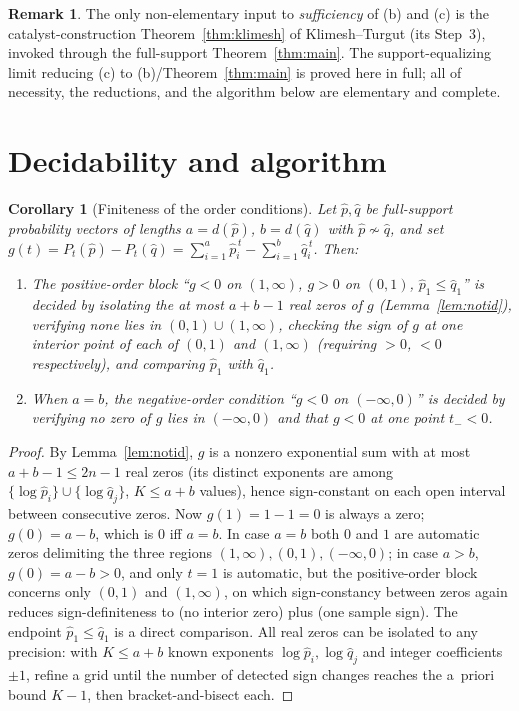 \documentclass{amsart}
\theoremstyle{plain}
\newtheorem{corollary}{Corollary}
\theoremstyle{definition}
\newtheorem{remark}{Remark}
\begin{document}
\begin{remark}\label{rem:c-suff-honest}
The only non-elementary input to \emph{sufficiency} of (b) and (c) is the
catalyst-construction Theorem~\ref{thm:klimesh} of Klimesh--Turgut (its Step~3),
invoked through the full-support Theorem~\ref{thm:main}. The support-equalizing limit
reducing (c) to (b)/Theorem~\ref{thm:main} is proved here in full; all of necessity,
the reductions, and the algorithm below are elementary and complete.
\end{remark}

\section{Decidability and algorithm}\label{sec:dec}

\begin{corollary}[Finiteness of the order conditions]\label{cor:finite}
Let $\hat p,\hat q$ be full-support probability vectors of lengths $a=d(\hat p)$,
$b=d(\hat q)$ with $\hat p\not\sim\hat q$, and set
$g(t)=P_t(\hat p)-P_t(\hat q)=\sum_{i=1}^{a}\hat p_i^{\,t}-\sum_{i=1}^{b}\hat q_i^{\,t}$.
Then:
\begin{enumerate}
\item The positive-order block ``$g<0$ on $(1,\infty)$, $g>0$ on $(0,1)$,
$\hat p_1\le\hat q_1$'' is decided by isolating the at most $a+b-1$ real zeros of $g$
(Lemma~\ref{lem:notid}), verifying none lies in $(0,1)\cup(1,\infty)$, checking the sign
of $g$ at one interior point of each of $(0,1)$ and $(1,\infty)$ (requiring $>0$, $<0$
respectively), and comparing $\hat p_1$ with $\hat q_1$.
\item When $a=b$, the negative-order condition ``$g<0$ on $(-\infty,0)$'' is decided by
verifying no zero of $g$ lies in $(-\infty,0)$ and that $g<0$ at one point $t_-<0$.
\end{enumerate}
\end{corollary}
\begin{proof}
By Lemma~\ref{lem:notid}, $g$ is a nonzero exponential sum with at most $a+b-1\le 2n-1$
real zeros (its distinct exponents are among $\{\log\hat p_i\}\cup\{\log\hat q_j\}$,
$K\le a+b$ values), hence sign-constant on each open interval between consecutive zeros.
Now $g(1)=1-1=0$ is always a zero; $g(0)=a-b$, which is $0$ iff $a=b$. In case
$a=b$ both $0$ and $1$ are automatic zeros delimiting the three regions $(1,\infty),
(0,1),(-\infty,0)$; in case $a>b$, $g(0)=a-b>0$, and only $t=1$ is automatic, but the
positive-order block concerns only $(0,1)$ and $(1,\infty)$, on which sign-constancy
between zeros again reduces sign-definiteness to (no interior zero) plus (one sample
sign). The endpoint $\hat p_1\le\hat q_1$ is a direct comparison. All real zeros can be
isolated to any precision: with $K\le a+b$ known exponents $\log\hat p_i,\log\hat q_j$
and integer coefficients $\pm1$, refine a grid until the number of detected sign changes
reaches the a~priori bound $K-1$, then bracket-and-bisect each.
\end{proof}
\end{document}
